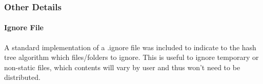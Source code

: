 
\subsubsection{Other Details}

\paragraph*{Ignore File} A standard implementation of a .ignore file was included to indicate to the hash tree algorithm which files/folders to ignore. This is useful to ignore temporary or non-static files, which contents will vary by user and thus won't need to be distributed.
